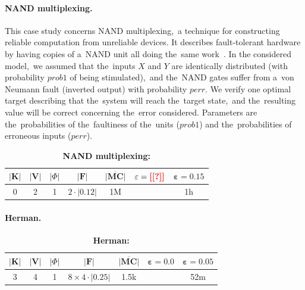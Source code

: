 \paragraph{NAND multiplexing.}
This case study concerns NAND multiplexing,~a technique for constructing reliable computation from unreliable devices.
It describes fault-tolerant hardware by having copies of a~NAND unit all doing the~same work~\cite{nand}.
In the considered model,~we assumed that the~inputs $X$ and $Y$ are identically distributed (with probability $prob1$ of being stimulated),~and the~NAND gates suffer from a~von Neumann fault (inverted output) with probability $perr$.
We verify one optimal target describing that the~system will reach the~target state,~and the~resulting value will be correct concerning the~error considered.
Parameters are the~probabilities of the~faultiness of the~units ($prob1$) and the~probabilities of erroneous inputs ($perr$).

\begin{table}[h!]
\centering
\begin{tabular}{|c|c|c|c|c|c|c|}
\hline
$\lvert \mathbf{K} \rvert$ & $\lvert \mathbf{V} \rvert$ & $\lvert \varPhi \rvert$ & $\lvert \mathcal{\mathbf{F}} \rvert$ & $\overline{\mathbf{\lvert MC \rvert}}$ & $\mathbf{\varepsilon = \textcolor{red}{\textbf{[[?]]}}}$ & $\mathbf{\varepsilon = 0.15}$ \\ \hline
0 & 2 & 1 & $2 \cdot \lvert 0.12 \rvert$ & 1M & \todo{?} & 1h \\ \hline
\end{tabular}
\caption{\textbf{NAND multiplexing:}}
\end{table}

\paragraph{Herman.}

\begin{table}[h!]
\centering
\begin{tabular}{|c|c|c|c|c|c|c|}
\hline
$\lvert \mathbf{K} \rvert$ & $\lvert \mathbf{V} \rvert$ & $\lvert \varPhi \rvert$ & $\lvert \mathcal{\mathbf{F}} \rvert$ & $\overline{\mathbf{\lvert MC \rvert}}$ & $\mathbf{\varepsilon = 0.0}$ & $\mathbf{\varepsilon = 0.05}$ \\ \hline
3 & 4 & 1 & $8 \times 4 \cdot \lvert 0.25 \rvert$ & 1.5k & \todo{?} & 52m \\ \hline
\end{tabular}
\caption{\textbf{Herman:}}
\end{table}

